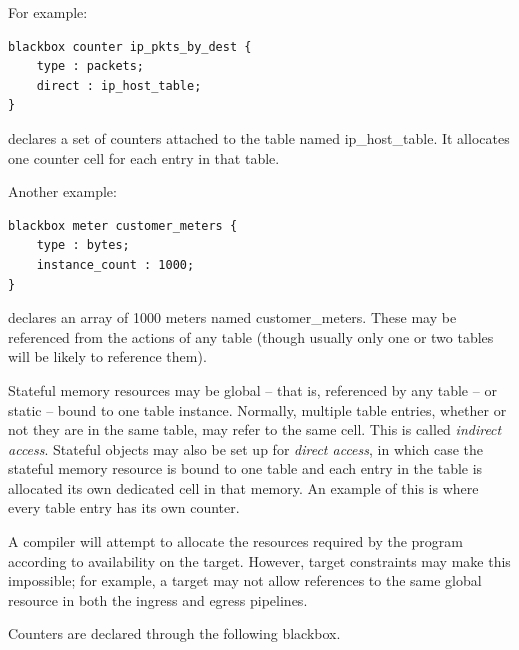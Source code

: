 \documentclass[12pt]{article}
\begin{document}
For example:

\begin{lstlisting}[style=P4style]
blackbox counter ip_pkts_by_dest {
    type : packets;
    direct : ip_host_table;
}
\end{lstlisting}


declares a set of counters attached to the table named ip_host_table. It 
allocates one counter cell for each entry in that table.

Another example:

\begin{lstlisting}[style=P4style]
blackbox meter customer_meters {
    type : bytes;
    instance_count : 1000;
}
\end{lstlisting}


declares an array of 1000 meters named customer_meters. These may be referenced 
from the actions of any table (though usually only one or two tables will 
be likely to reference them).

Stateful memory resources may be global -- that is, referenced by 
any table -- or static -- bound to one table instance. Normally, multiple 
table entries, whether or not they are in the same table, may refer to the 
same cell. This is called \textit{indirect access}. Stateful objects may also
be set up for \textit{direct access}, in which case the stateful memory resource
is bound to one table and each entry in the table is allocated its own dedicated
cell in that memory. An example of this is where every table entry has its own
counter.

A compiler will attempt to allocate the resources required by the program 
according to availability on the target. However, target constraints may make 
this impossible; for example, a target may not allow references to the same 
global resource in both the ingress and egress pipelines.


Counters are declared through the following blackbox.
\end{document}
